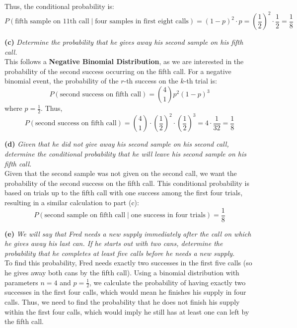 \begin{solution}
Thus, the conditional probability is:
\[
P(\text{fifth sample on 11th call} \mid \text{four samples in first eight calls}) = (1 - p)^2 \cdot p = \left(\frac{1}{2}\right)^2 \cdot \frac{1}{2} = \frac{1}{8}
\]

\textbf{ (c)} \textit{Determine the probability that he gives away his second sample on his fifth call.}\\

This follows a \textbf{Negative Binomial Distribution}, as we are interested in the probability of the second success occurring on the fifth call. For a negative binomial event, the probability of the \(r\)-th success on the \(k\)-th trial is:
\[
P(\text{second success on fifth call}) = \binom{4}{1} p^2 (1 - p)^3
\]
where \(p = \frac{1}{2}\). Thus,
\[
P(\text{second success on fifth call}) = \binom{4}{1} \cdot \left(\frac{1}{2}\right)^2 \cdot \left(\frac{1}{2}\right)^3 = 4 \cdot \frac{1}{32} = \frac{1}{8}
\]

\textbf{ (d)} \textit{Given that he did not give away his second sample on his second call, determine the conditional probability that he will leave his second sample on his fifth call.}\\

Given that the second sample was not given on the second call, we want the probability of the second success on the fifth call. This conditional probability is based on trials up to the fifth call with one success among the first four trials, resulting in a similar calculation to part (c):
\[
P(\text{second sample on fifth call} \mid \text{one success in four trials}) = \frac{1}{8}
\]

\textbf{ (e)} \textit{We will say that Fred needs a new supply immediately after the call on which he gives away his last can. If he starts out with two cans, determine the probability that he completes at least five calls before he needs a new supply.}\\

To find this probability, Fred needs exactly two successes in the first five calls (so he gives away both cans by the fifth call). Using a binomial distribution with parameters \(n = 4\) and \(p= \frac{1}{2}\), we calculate the probability of having exactly two successes in the first four calls, which would mean he finishes his supply in four calls. Thus, we need to find the probability that he does not finish his supply within the first four calls, which would imply he still has at least one can left by the fifth call.\\


\end{solution}
